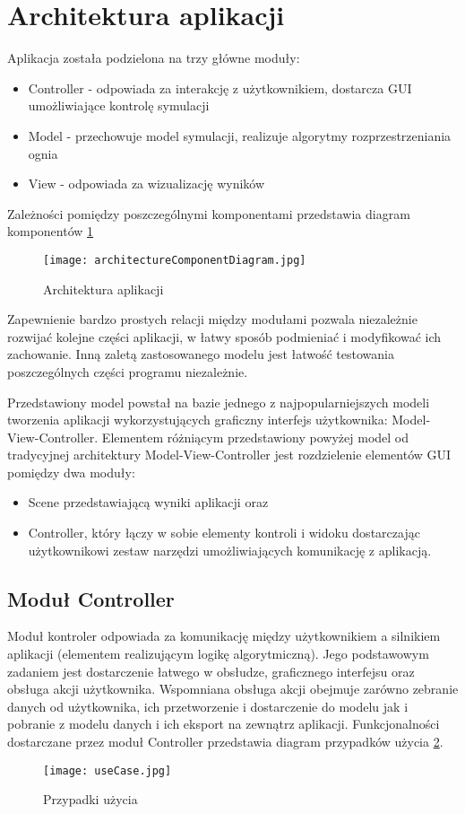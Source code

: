 \section {Architektura aplikacji}
Aplikacja została podzielona na trzy główne moduły:
\begin{itemize}
\item Controller - odpowiada za interakcję z użytkownikiem, dostarcza GUI umożliwiające kontrolę symulacji
\item Model - przechowuje model symulacji, realizuje algorytmy rozprzestrzeniania ognia
\item View - odpowiada za wizualizację wyników
\end{itemize}
Zależności pomiędzy poszczególnymi komponentami przedstawia diagram komponentów \ref{architektura aplikacji}
\begin{figure}
\begin {center}
\texttt{[image: architectureComponentDiagram.jpg]} \\
\caption { Architektura aplikacji}
\label {architektura aplikacji}
\end {center}
\end{figure}
Zapewnienie bardzo prostych relacji między modułami pozwala niezależnie rozwijać kolejne części aplikacji, w łatwy
sposób podmieniać i modyfikować ich zachowanie. Inną zaletą zastosowanego modelu jest łatwość
testowania poszczególnych części programu niezależnie.

Przedstawiony model powstał na bazie jednego z najpopularniejszych modeli tworzenia aplikacji wykorzystujących graficzny interfejs użytkownika: Model-View-Controller. Elementem różniącym przedstawiony powyżej model od tradycyjnej architektury Model-View-Controller
jest rozdzielenie elementów GUI pomiędzy dwa moduły:
\begin{itemize}
\item Scene przedstawiającą wyniki aplikacji oraz
\item Controller, który łączy w sobie elementy kontroli i widoku dostarczając użytkownikowi zestaw narzędzi umożliwiających komunikację z aplikacją.
\end {itemize}
\subsection{Moduł Controller}
Moduł kontroler odpowiada za komunikację między użytkownikiem a silnikiem aplikacji (elementem realizującym logikę algorytmiczną). 
Jego podstawowym zadaniem jest dostarczenie łatwego w obsłudze, graficznego interfejsu oraz 
obsługa akcji użytkownika. Wspomniana obsługa akcji obejmuje zarówno zebranie danych od użytkownika, ich przetworzenie
i dostarczenie do modelu jak i pobranie z modelu danych i ich eksport na zewnątrz aplikacji.
Funkcjonalności dostarczane przez moduł Controller przedstawia diagram przypadków użycia \ref{przypadki uzycia}.
\begin{figure}
\begin {center}
\texttt{[image: useCase.jpg]} \\
\caption { Przypadki użycia}
\label {przypadki uzycia}
\end {center}
\end{figure}


